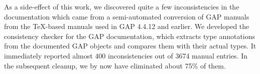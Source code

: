 As a side-effect of this work, we discovered quite a few inconsistencies in the \GAP
documentation which came from a semi-automated conversion of GAP manuals from the
\TeX-based manuals used in GAP 4.4.12 and earlier.  We developed the consistency checker
for the GAP documentation, which extracts type annotations from the documented GAP objects
and compares them with their actual types. It immediately reported almost 400
inconsistencies out of 3674 manual entries. In the subsequent cleanup, we by now have
eliminated about 75\% of them. 

